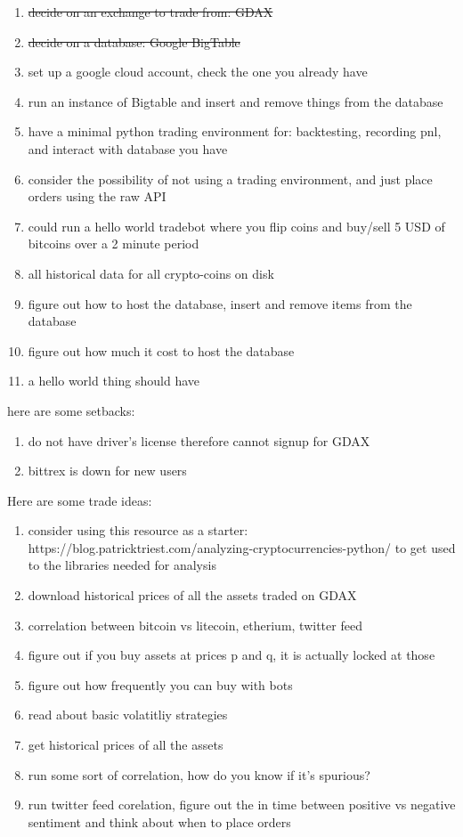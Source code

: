 \begin{enumerate}
	\item \st{decide on an exchange to trade from: GDAX}
	\item \st{decide on a database: Google BigTable}
	\item set up a google cloud account, check the one you already have
	\item run an instance of Bigtable and insert and remove things from the database
	\item have a minimal python trading environment for: backtesting, recording pnl, and interact with database you    have
	\item consider the possibility of not using a trading environment, and just place orders using the raw API
	\item could run a hello world tradebot where you flip coins and buy/sell 5 USD of bitcoins over a 2 minute period

	\item all historical data for all crypto-coins on disk
	\item figure out how to host the database, insert and remove items from the database
	\item figure out how much it cost to host the database
	\item a hello world thing should have 
\end{enumerate}

here are some setbacks:

\begin{enumerate}
	\item do not have driver's license therefore cannot signup for GDAX
	\item bittrex is down for new users
\end{enumerate}

Here are some trade ideas:

\begin{enumerate}
	\item consider using this resource as a starter: https://blog.patricktriest.com/analyzing-cryptocurrencies-python/
	to get used to the libraries needed for analysis
	\item download historical prices of all the assets traded on GDAX
	\item correlation between bitcoin vs {litecoin, etherium, twitter feed}
	\item figure out if you buy assets at prices p and q, it is actually locked at those 
	\item figure out how frequently you can buy with bots
	\item read about basic volatitliy strategies
	\item get historical prices of all the assets
	\item run some sort of correlation, how do you know if it's spurious?
	\item run twitter feed corelation, figure out the in time between positive vs negative
	  sentiment and think about when to place orders
\end{enumerate}


